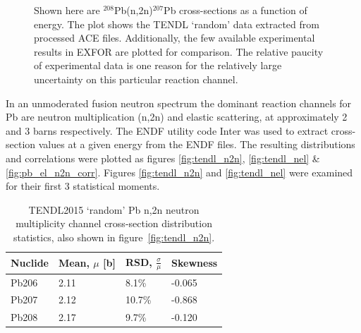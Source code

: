 \begin{figure}[H]
  \centering
  \caption{Shown here are $^{208}$Pb(n,2n)$^{207}$Pb cross-sections as a function of energy. The plot shows the TENDL `random' data extracted from processed ACE files. Additionally, the few available experimental results in EXFOR are plotted for comparison. The relative paucity of experimental data is one reason for the relatively large uncertainty on this particular reaction channel.}
  \label{fig:tendl_lead}
\end{figure}

In an unmoderated fusion neutron spectrum the dominant reaction channels for Pb are neutron multiplication (n,2n) and elastic scattering, at approximately 2 and 3 barns respectively. The ENDF utility code Inter was used to extract cross-section values at a given energy from the ENDF files. The resulting distributions and correlations were plotted as figures \ref{fig:tendl_n2n}, \ref{fig:tendl_nel} \& \ref{fig:pb_el_n2n_corr}. Figures \ref{fig:tendl_n2n} and \ref{fig:tendl_nel} were examined for their first 3 statistical moments. 

\begin{table}[H]
  \footnotesize
  \centering 
  \begin{tabular}{llll}
    \toprule
    Nuclide & Mean, $\mu$ [b] & RSD, $\frac{\sigma}{\mu}$ & Skewness \\
    \midrule
    Pb206 & 2.11 & 8.1\% & -0.065 \\
    Pb207 & 2.12 & 10.7\% & -0.868 \\
    Pb208 & 2.17 & 9.7\% & -0.120 \\
    \bottomrule
  \end{tabular}
  \caption{TENDL2015 `random' Pb n,2n neutron multiplicity channel cross-section distribution statistics, also shown in figure~\ref{fig:tendl_n2n}.}
  \label{table:n2n}
\end{table}

